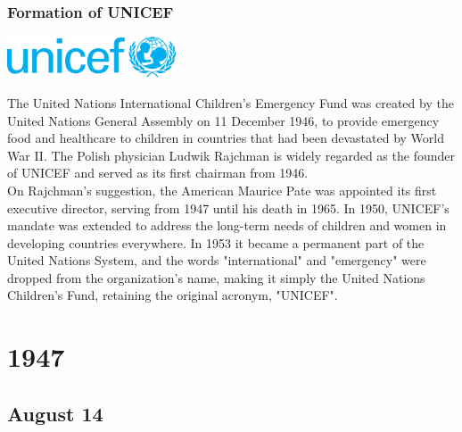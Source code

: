 \documentclass[11pt]{report}
\begin{document}
\subsection{Formation of UNICEF}
\vspace{2mm}\begin{center}\includegraphics[width=5cm]{./img/unicefLogo.jpg}\end{center}
The United Nations International Children's Emergency Fund was created by the United Nations General Assembly on 11 December 1946, to provide emergency food and healthcare to children in countries that had been devastated by World War II. The Polish physician Ludwik Rajchman is widely regarded as the founder of UNICEF and served as its first chairman from 1946.\\
On Rajchman's suggestion, the American Maurice Pate was appointed its first executive director, serving from 1947 until his death in 1965. In 1950, UNICEF's mandate was extended to address the long-term needs of children and women in developing countries everywhere. In 1953 it became a permanent part of the United Nations System, and the words "international" and "emergency" were dropped from the organization's name, making it simply the United Nations Children's Fund, retaining the original acronym, "UNICEF".

\chapter{1947}
\section{August 14}
\end{document}
